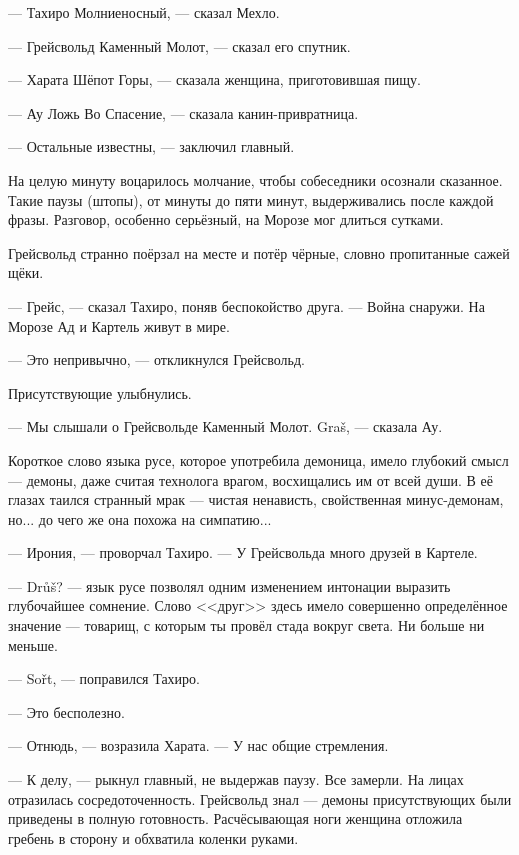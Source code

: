 --- Тахиро Молниеносный, --- сказал Мехло.

--- Грейсвольд Каменный Молот, --- сказал его спутник.

--- Харата Шёпот Горы, --- сказала женщина, приготовившая пищу.

--- Ау Ложь Во Спасение, --- сказала канин-привратница.

--- Остальные известны, --- заключил главный.

На целую минуту воцарилось молчание, чтобы собеседники осознали сказанное.
Такие паузы (штопы), от минуты до пяти минут, выдерживались после каждой фразы.
Разговор, особенно серьёзный, на Морозе мог длиться сутками\FM.

Грейсвольд странно поёрзал на месте и потёр чёрные, словно пропитанные сажей щёки.

--- Грейс, --- сказал Тахиро, поняв беспокойство друга.
--- Война снаружи.
На Морозе Ад и Картель живут в мире.

--- Это непривычно, --- откликнулся Грейсвольд.

Присутствующие улыбнулись.

--- Мы слышали о Грейсвольде Каменный Молот.
Gra\v{s}\FM, --- сказала Ау.

Короткое слово языка русе, которое употребила демоница, имело глубокий смысл --- демоны, даже считая технолога врагом, восхищались им от всей души.
В её глазах таился странный мрак --- чистая ненависть, свойственная минус-демонам, но... до чего же она похожа на симпатию...

--- Ирония, --- проворчал Тахиро.
--- У Грейсвольда много друзей в Картеле.

--- Dr\r{u}\v{s}? --- язык русе позволял одним изменением интонации выразить глубочайшее сомнение.
Слово <<друг>> здесь имело совершенно определённое значение --- товарищ, с которым ты провёл стада вокруг света.
Ни больше ни меньше.

--- So\v{r}t\FM, --- поправился Тахиро.

--- Это бесполезно.

--- Отнюдь, --- возразила Харата.
--- У нас общие стремления.

--- К делу, --- рыкнул главный, не выдержав паузу.
Все замерли.
На лицах отразилась сосредоточенность.
Грейсвольд знал --- демоны присутствующих были приведены в полную готовность.
Расчёсывающая ноги женщина отложила гребень в сторону и обхватила коленки руками.

